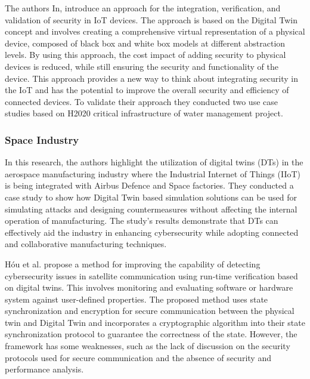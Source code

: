 The authors In\cite{maillet-contozEndtoendSecurityValidation2020}, introduce an approach for the integration, verification, and validation of security in IoT devices. The approach is based on the Digital Twin concept and involves creating a comprehensive virtual representation of a physical device, composed of black box and white box models at different abstraction levels. By using this approach, the cost impact of adding security to physical devices is reduced, while still ensuring the security and functionality of the device. This approach provides a new way to think about integrating security in the IoT and has the potential to improve the overall security and efficiency of connected devices. To validate their approach they conducted two use case studies based on H2020 critical infrastructure of water management project.

\subsubsection*{Space Industry}

In \cite{adrienbacueDigitalTwinsEnhanced2022} this research, the authors highlight the utilization of digital twins (DTs) in the aerospace manufacturing industry where the Industrial Internet of Things (IIoT) is being integrated with Airbus Defence and Space factories. They conducted a case study to show how Digital Twin based simulation solutions can be used for simulating attacks and designing countermeasures without affecting the internal operation of manufacturing. The study's results demonstrate that DTs can effectively aid the industry in enhancing cybersecurity while adopting connected and collaborative manufacturing techniques.

Hóu et al.\cite{houDigitalTwinRuntime2022} propose a method for improving the capability of detecting cybersecurity issues in satellite communication using run-time verification based on digital twins. This involves monitoring and evaluating software or hardware system against user-defined properties. The proposed method uses state synchronization and encryption for secure communication between the physical twin and Digital Twin and incorporates a cryptographic algorithm into their state synchronization protocol to guarantee the correctness of the state. However, the framework has some weaknesses, such as the lack of discussion on the security protocols used for secure communication and the absence of security and performance analysis.

